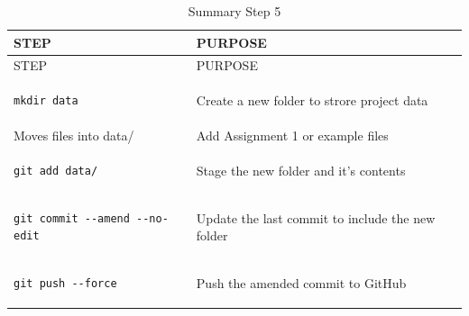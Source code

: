 \documentclass[
  11pt,
  a4paper,
]{article}
\begin{document}
\begin{longtable}[]{@{}
  >{\raggedright\arraybackslash}p{}
  >{\raggedright\arraybackslash}p{}@{}}
\caption{Summary Step 5}\tabularnewline
\toprule\noalign{}
\begin{minipage}[b]{\linewidth}\raggedright
STEP
\end{minipage} & \begin{minipage}[b]{\linewidth}\raggedright
PURPOSE
\end{minipage} \\
\midrule\noalign{}
\endfirsthead
\toprule\noalign{}
\begin{minipage}[b]{\linewidth}\raggedright
STEP
\end{minipage} & \begin{minipage}[b]{\linewidth}\raggedright
PURPOSE
\end{minipage} \\
\midrule\noalign{}
\endhead
\bottomrule\noalign{}
\endlastfoot
\begin{minipage}[t]{\linewidth}\raggedright
\begin{verbatim}
mkdir data
\end{verbatim}
\end{minipage} & Create a new folder to strore project data \\
Moves files into data/ & Add Assignment 1 or example files \\
\begin{minipage}[t]{\linewidth}\raggedright
\begin{verbatim}
git add data/
\end{verbatim}
\end{minipage} & Stage the new folder and it's contents \\
\begin{minipage}[t]{\linewidth}\raggedright
\begin{verbatim}
git commit --amend --no-edit
\end{verbatim}
\end{minipage} & Update the last commit to include the new folder \\
\begin{minipage}[t]{\linewidth}\raggedright
\begin{verbatim}
git push --force
\end{verbatim}
\end{minipage} & Push the amended commit to GitHub \\
\end{longtable}
\end{document}
